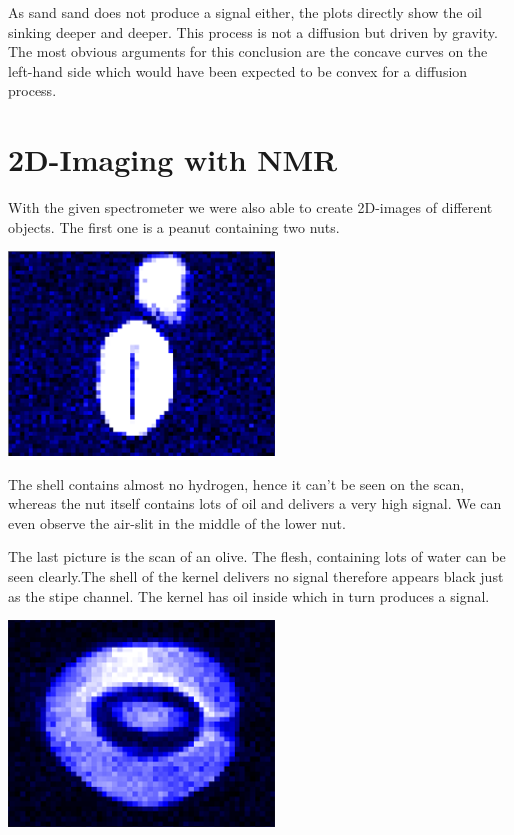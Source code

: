 \documentclass[12pt, english]{scrartcl} %
\begin{document}
\begin{multicols}{2}
As sand sand does not produce a signal either, the plots directly show the oil sinking deeper and deeper. This process is not a diffusion but driven by gravity. The most obvious arguments for this conclusion are the concave curves on the left-hand side which would have been expected to be convex for a diffusion process.

\section{2D-Imaging with NMR}

With the given spectrometer we were also able to create 2D-images of different objects. The first one is a peanut containing two nuts.

\begin{center}
\includegraphics[width=200pt]{graphics/peanut.png}
\label{peanut}
\end{center}

The shell contains almost no hydrogen, hence it can't be seen on the scan, whereas the nut itself contains lots of oil and delivers a very high signal. We can even observe the air-slit in the middle of the lower nut. 

The last picture is the scan of an olive. The flesh, containing lots of water can be seen clearly.The shell of the kernel delivers no signal therefore appears black just as the stipe channel. The kernel has oil inside which in turn produces a signal.

\begin{center}
\includegraphics[width=200pt]{graphics/olive.png}
\label{olive}
\end{center}




\end{multicols}
\end{document}
